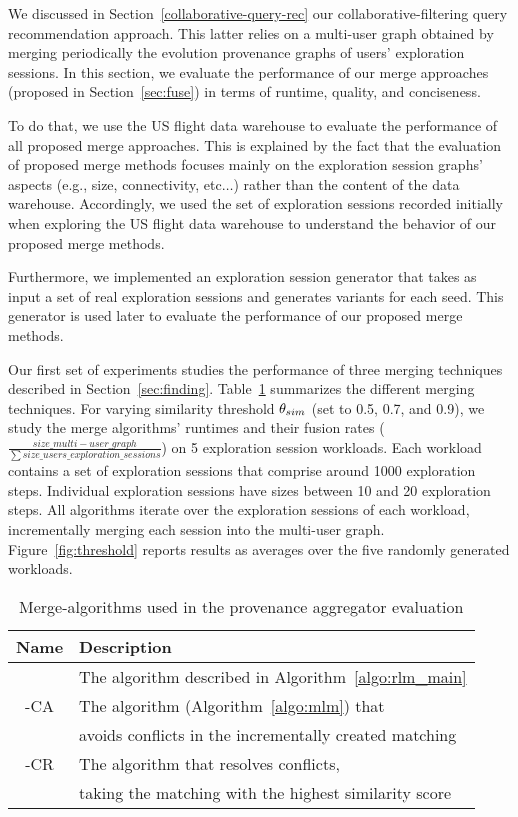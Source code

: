 \label{eva:merge}

We discussed in Section~\ref{collaborative-query-rec} our collaborative-filtering query recommendation approach. This latter relies on a multi-user graph obtained by merging periodically the evolution provenance graphs of users' exploration sessions.
In this section, we evaluate the performance of our merge approaches (proposed in Section~\ref{sec:fuse}) in terms of runtime, quality, and conciseness.


To do that, we use the US flight data warehouse to evaluate the performance of all proposed merge approaches.
 This is explained by the fact that the evaluation of proposed merge methods focuses mainly on the exploration session graphs' aspects (e.g., size, connectivity, etc$\ldots$) rather than the content of the data warehouse. Accordingly, we used the set of exploration sessions recorded initially when exploring the US flight data warehouse to understand the behavior of our proposed merge methods.
 
Furthermore, we implemented an exploration session generator that takes as input a set of real exploration sessions and generates variants for each seed. This generator is used later to evaluate the performance of our proposed merge methods.





Our first set of experiments studies the performance of three merging techniques described in Section~\ref{sec:finding}. Table~\ref{tab:merge-algo} summarizes the different merging techniques. For varying similarity threshold $\theta_{sim}$ (set to 0.5, 0.7, and 0.9), we study the merge algorithms' runtimes and their fusion rates ($\frac{size\_multi-user\_graph }{\sum size\_users\_exploration\_sessions}$) on 5 exploration session workloads. Each workload contains a set of exploration sessions that comprise around 1000 exploration steps. Individual exploration sessions have sizes between 10 and 20 exploration steps. All algorithms iterate over the exploration sessions of each workload, incrementally merging each session into the multi-user graph.
 Figure~\ref{fig:threshold} reports results as averages over the five randomly generated workloads. 


 \begin{table}[t]
\centering
\scriptsize
\begin{tabular}{|c|l|} \hline
Name & Description \\ \hline
\rlm{} & The \rlmLong{} algorithm described in Algorithm~\ref{algo:rlm_main}\\  \hline
\mlm{}-CA & The \mlmLong{} algorithm (Algorithm~\ref{algo:mlm}) that \\
&avoids conflicts in the incrementally created matching \\ \hline
\mlm{}-CR & The \mlmLong{} algorithm that resolves conflicts,\\
& taking the matching with the highest similarity score \\ \hline
\end{tabular}
\caption{Merge-algorithms used in the provenance aggregator evaluation} 
\label{tab:merge-algo}
\end{table}



